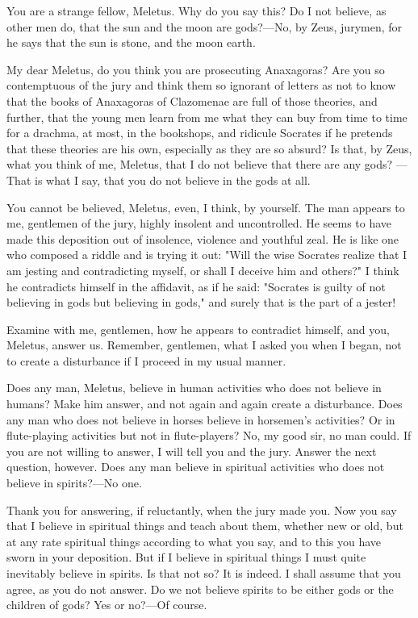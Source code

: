You are a strange fellow, Meletus. Why do you say this? Do I not believe, as other men do,
that the sun and the moon are gods?—No, by Zeus, jurymen, for he says that the sun is stone, and
the moon earth.

My dear Meletus, do you think you are prosecuting Anaxagoras? Are you so contemptuous
of the jury and think them so ignorant of letters as not to know that the books of Anaxagoras of
Clazomenae are full of those theories, and further, that the young men learn from me what they
can buy from time to time for a drachma, at most, in the bookshops, and ridicule Socrates if he
pretends that these theories are his own, especially as they are so absurd? Is that, by Zeus, what
you think of me, Meletus, that I do not believe that there are any gods? —That is what I say, that
you do not believe in the gods at all.

You cannot be believed, Meletus, even, I think, by yourself. The man appears to me,
gentlemen of the jury, highly insolent and uncontrolled. He seems to have made this deposition
out of insolence, violence and youthful zeal. He is like one who composed a riddle and is trying
it out: "Will the wise Socrates realize that I am jesting and contradicting myself, or shall I deceive
him and others?" I think he contradicts himself in the affidavit, as if he said: "Socrates is guilty of
not believing in gods but believing in gods," and surely that is the part of a jester!

Examine with me, gentlemen, how he appears to contradict himself, and you, Meletus, answer
us. Remember, gentlemen, what I asked you when I began, not to create a disturbance if I proceed
in my usual manner.

Does any man, Meletus, believe in human activities who does not believe in humans? Make
him answer, and not again and again create a disturbance. Does any man who does not believe in
horses believe in horsemen's activities? Or in flute-playing activities but not in flute-players? No,
my good sir, no man could. If you are not willing to answer, I will tell you and the jury. Answer
the next question, however. Does any man believe in spiritual activities who does not believe in
spirits?—No one.

Thank you for answering, if reluctantly, when the jury made you. Now you say that I believe
in spiritual things and teach about them, whether new or old, but at any rate spiritual things
according to what you say, and to this you have sworn in your deposition. But if I believe in
spiritual things I must quite inevitably believe in spirits. Is that not so? It is indeed. I shall assume
that you agree, as you do not answer. Do we not believe spirits to be either gods or the children
of gods? Yes or no?—Of course.

